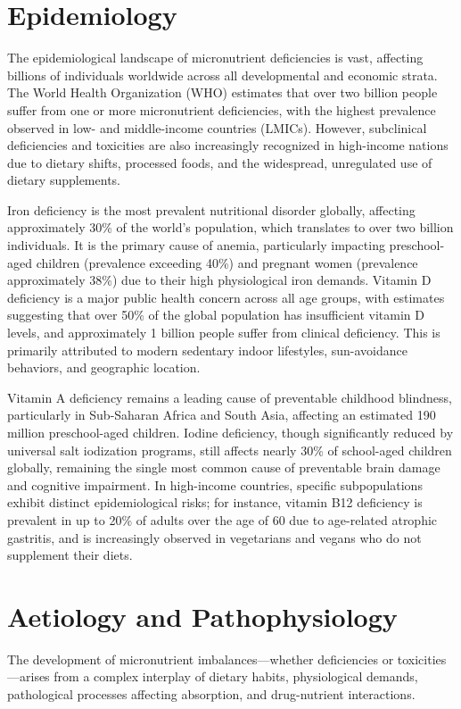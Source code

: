 \section*{Epidemiology}
The epidemiological landscape of micronutrient deficiencies is vast, affecting billions of individuals worldwide across all developmental and economic strata. The World Health Organization (WHO) estimates that over two billion people suffer from one or more micronutrient deficiencies, with the highest prevalence observed in low- and middle-income countries (LMICs). However, subclinical deficiencies and toxicities are also increasingly recognized in high-income nations due to dietary shifts, processed foods, and the widespread, unregulated use of dietary supplements.

Iron deficiency is the most prevalent nutritional disorder globally, affecting approximately 30\% of the world's population, which translates to over two billion individuals. It is the primary cause of anemia, particularly impacting preschool-aged children (prevalence exceeding 40\%) and pregnant women (prevalence approximately 38\%) due to their high physiological iron demands. Vitamin D deficiency is a major public health concern across all age groups, with estimates suggesting that over 50\% of the global population has insufficient vitamin D levels, and approximately 1 billion people suffer from clinical deficiency. This is primarily attributed to modern sedentary indoor lifestyles, sun-avoidance behaviors, and geographic location.

Vitamin A deficiency remains a leading cause of preventable childhood blindness, particularly in Sub-Saharan Africa and South Asia, affecting an estimated 190 million preschool-aged children. Iodine deficiency, though significantly reduced by universal salt iodization programs, still affects nearly 30\% of school-aged children globally, remaining the single most common cause of preventable brain damage and cognitive impairment. In high-income countries, specific subpopulations exhibit distinct epidemiological risks; for instance, vitamin B12 deficiency is prevalent in up to 20\% of adults over the age of 60 due to age-related atrophic gastritis, and is increasingly observed in vegetarians and vegans who do not supplement their diets.

\section*{Aetiology and Pathophysiology}
The development of micronutrient imbalances—whether deficiencies or toxicities—arises from a complex interplay of dietary habits, physiological demands, pathological processes affecting absorption, and drug-nutrient interactions.


